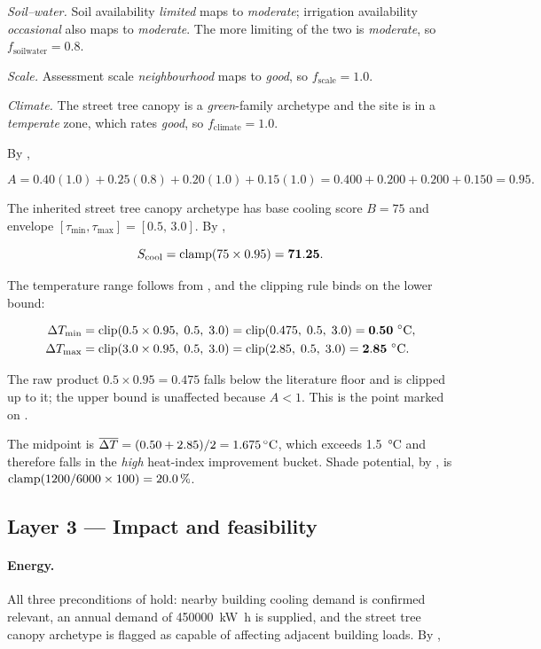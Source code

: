 \emph{Soil--water.} Soil availability \emph{limited} maps to \emph{moderate};
irrigation availability \emph{occasional} also maps to \emph{moderate}. The
more limiting of the two is \emph{moderate}, so
$f_{\mathrm{soilwater}} = 0.8$.

\emph{Scale.} Assessment scale \emph{neighbourhood} maps to \emph{good}, so
$f_{\mathrm{scale}} = 1.0$.

\emph{Climate.} The street tree canopy is a \emph{green}-family archetype and
the site is in a \emph{temperate} zone, which  rates
\emph{good}, so $f_{\mathrm{climate}} = 1.0$.

By ,

\[
A = 0.40(1.0) + 0.25(0.8) + 0.20(1.0) + 0.15(1.0)
  = 0.400 + 0.200 + 0.200 + 0.150 = \mathbf{0.95}.
\]

The inherited street tree canopy archetype has base cooling score $B = 75$ and
envelope $[\tau_{\min}, \tau_{\max}] = [0.5,\, 3.0]$. By ,

\[
S_{\mathrm{cool}} = \operatorname{clamp}\!\left(75 \times 0.95\right) = \mathbf{71.25}.
\]

The temperature range follows from , and the clipping
rule binds on the lower bound:

\begin{align*}
\dT_{\min} &= \clip{0.5 \times 0.95}{0.5}{3.0} = \clip{0.475}{0.5}{3.0}
            = \mathbf{0.50}\ \si{\degreeCelsius}, \\
\dT_{\max} &= \clip{3.0 \times 0.95}{0.5}{3.0} = \clip{2.85}{0.5}{3.0}
            = \mathbf{2.85}\ \si{\degreeCelsius}.
\end{align*}

The raw product $0.5 \times 0.95 = 0.475$ falls below the literature floor and
is clipped up to it; the upper bound is unaffected because $A < 1$. This is the
point marked on .

The midpoint is $\overline{\dT} = (0.50 + 2.85)/2 = \qty{1.675}{\degreeCelsius}$,
which exceeds \qty{1.5}{\degreeCelsius} and therefore falls in the \emph{high}
heat-index improvement bucket. Shade potential, by , is
$\operatorname{clamp}\!\left(1200/6000 \times 100\right) = \SI{20.0}{\percent}$.

\subsection{Layer 3 --- Impact and feasibility}

\paragraph{Energy.} All three preconditions of  hold: nearby
building cooling demand is confirmed relevant, an annual demand of
\qty{450000}{\kilo\watt\hour} is supplied, and the street tree canopy archetype
is flagged as capable of affecting adjacent building loads. By
,

